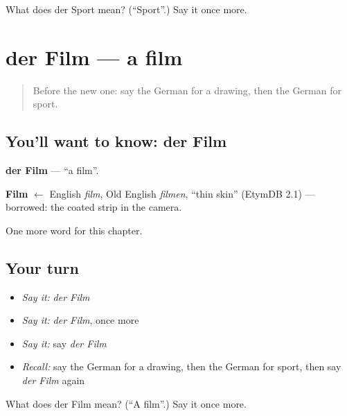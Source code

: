\begin{tcolorbox}[breakable,colback=teal!4,colframe=teal!35!black,title={Before you move on}]
What does der Sport mean? (\textquotedblleft{}Sport\textquotedblright{}.) Say it once more.
\end{tcolorbox}
\section[der Film]{der Film — a film}

\label{lesson:GE-C129-film}



\begin{quote}
Before the new one: say the German for a drawing, then the German for sport.
\end{quote}

\subsection*{You'll want to know: der Film}
\textbf{der Film} — \textquotedblleft{}a film\textquotedblright{}.

\begin{cousinweb}
\textbf{Film} $\leftarrow$ English \emph{film}, Old English \emph{filmen}, \textquotedblleft{}thin skin\textquotedblright{} (EtymDB 2.1) — borrowed: the coated strip in the camera.
\end{cousinweb}

\begin{grammarlens}[title={What you've built}]
One more word for this chapter.
\end{grammarlens}

\subsection*{Your turn}
\begin{itemize}
\raggedright
  \item \emph{Say it:} \emph{der Film}
  \item \emph{Say it:} \emph{der Film}, once more
  \item \emph{Say it:} say \emph{der Film}
  \item \emph{Recall:} say the German for a drawing, then the German for sport, then say \emph{der Film} again
\end{itemize}

\begin{tcolorbox}[breakable,colback=teal!4,colframe=teal!35!black,title={Before you move on}]
What does der Film mean? (\textquotedblleft{}A film\textquotedblright{}.) Say it once more.
\end{tcolorbox}
